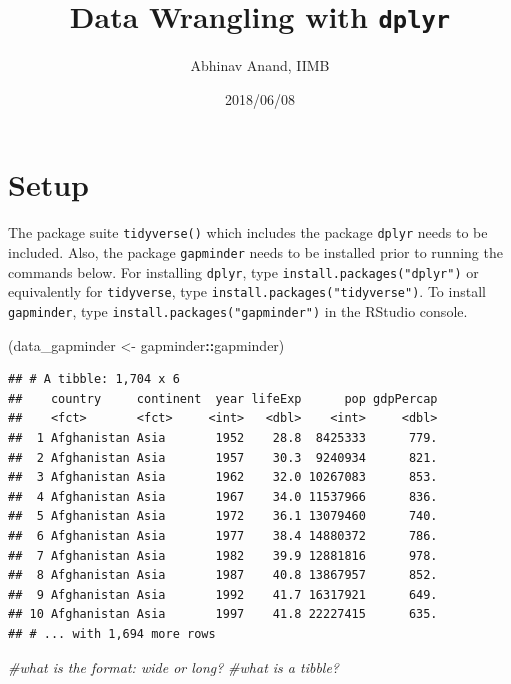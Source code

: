 \documentclass[11pt,]{article}
\title{Data Wrangling with \texttt{dplyr}}
\author{Abhinav Anand, IIMB}
\date{2018/06/08}
\newenvironment{Shaded}{\begin{snugshade}}{\end{snugshade}}
\newcommand{\StringTok}[1]{\textcolor[rgb]{0.31,0.60,0.02}{#1}}
\newcommand{\CommentTok}[1]{\textcolor[rgb]{0.56,0.35,0.01}{\textit{#1}}}
\newcommand{\OperatorTok}[1]{\textcolor[rgb]{0.81,0.36,0.00}{\textbf{#1}}}
\newcommand{\NormalTok}[1]{#1}
\begin{document}
\maketitle

\section{Setup}\label{setup}

The package suite \texttt{tidyverse()} which includes the package
\texttt{dplyr} needs to be included. Also, the package
\texttt{gapminder} needs to be installed prior to running the commands
below. For installing \texttt{dplyr}, type
\texttt{install.packages("dplyr")} or equivalently for
\texttt{tidyverse}, type \texttt{install.packages("tidyverse")}. To
install \texttt{gapminder}, type \texttt{install.packages("gapminder")}
in the RStudio console.

\begin{Shaded}
\begin{Highlighting}[]
\NormalTok{(data_gapminder <-}\StringTok{ }\NormalTok{gapminder}\OperatorTok{::}\NormalTok{gapminder)}
\end{Highlighting}
\end{Shaded}

\begin{verbatim}
## # A tibble: 1,704 x 6
##    country     continent  year lifeExp      pop gdpPercap
##    <fct>       <fct>     <int>   <dbl>    <int>     <dbl>
##  1 Afghanistan Asia       1952    28.8  8425333      779.
##  2 Afghanistan Asia       1957    30.3  9240934      821.
##  3 Afghanistan Asia       1962    32.0 10267083      853.
##  4 Afghanistan Asia       1967    34.0 11537966      836.
##  5 Afghanistan Asia       1972    36.1 13079460      740.
##  6 Afghanistan Asia       1977    38.4 14880372      786.
##  7 Afghanistan Asia       1982    39.9 12881816      978.
##  8 Afghanistan Asia       1987    40.8 13867957      852.
##  9 Afghanistan Asia       1992    41.7 16317921      649.
## 10 Afghanistan Asia       1997    41.8 22227415      635.
## # ... with 1,694 more rows
\end{verbatim}

\begin{Shaded}
\begin{Highlighting}[]
\CommentTok{#what is the format: wide or long?}
\CommentTok{#what is a tibble?}
\end{Highlighting}
\end{Shaded}
\end{document}
